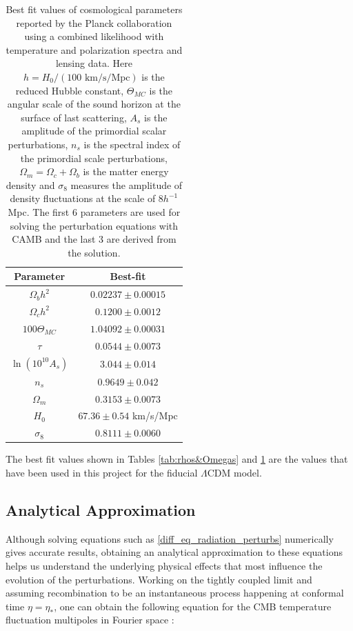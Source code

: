 \documentclass[openany,a4paper,12pt,oneside]{book}
\begin{document}
\begin{spacing}{1.5}
\begin{table}[!htb]
    \centering
    \begin{tabular}{cc} \hline
     Parameter & Best-fit \\ \hline
     $\Omega_b h^2$ & $0.02237\pm 0.00015$\\
     $\Omega_c h^2$ & $0.1200\pm 0.0012$\\
     $100\Theta_{MC}$ & $1.04092\pm 0.00031$ \\
     $\tau$ & $0.0544\pm 0.0073$\\ 
     $\ln{(10^{10}A_s)}$ & $3.044 \pm 0.014$ \\ 
     $n_s$ & $0.9649 \pm 0.042$ \\ \hline
     $\Omega_m$ & $0.3153 \pm 0.0073$ \\
     $H_0$ & $67.36 \pm 0.54$ km/s/Mpc \\
     $\sigma_8$ & $0.8111 \pm 0.0060$ \\ \hline
    \end{tabular}
    \caption{Best fit values of cosmological parameters reported by the Planck collaboration using a combined likelihood with temperature and polarization spectra and lensing data. Here $h=H_0/(100\text{ km/s/Mpc})$ is the reduced Hubble constant, $\Theta_{MC}$ is the angular scale of the sound horizon at the surface of last scattering, $A_s$ is the amplitude of the primordial scalar perturbations, $n_s$ is the spectral index of the primordial scale perturbations, $\Omega_m=\Omega_c+\Omega_b$ is the matter energy density and $\sigma_8$ measures the amplitude of density fluctuations at the scale of $8h^{-1}$ Mpc. The first 6 parameters are used for solving the perturbation equations with CAMB and the last 3 are derived from the solution.}
    \label{tab:planck_parameters}
\end{table}

The best fit values shown in Tables \ref{tab:rhos&Omegas} and \ref{tab:planck_parameters} are the values that have been used in this project for the fiducial $\Lambda$CDM model.

\subsection{Analytical Approximation}

Although solving equations such as \eqref{diff_eq_radiation_perturbs} numerically gives accurate results, obtaining an analytical approximation to these equations helps us understand the underlying physical effects that most influence the evolution of the perturbations. Working on the tightly coupled limit and assuming recombination to be an instantaneous process happening at conformal time $\eta=\eta_*$, one can obtain the following equation for the CMB temperature fluctuation multipoles in Fourier space \cite{dodelson2020modern}:


\end{spacing}
\end{document}
